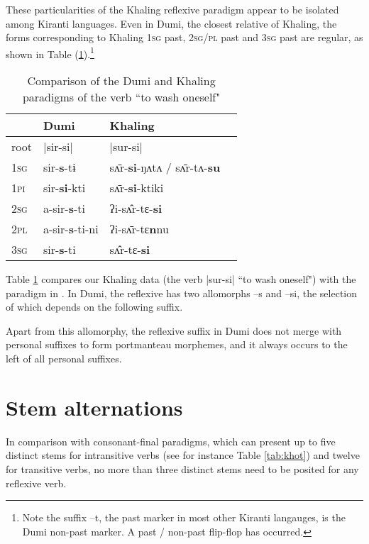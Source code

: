 \documentclass[twoside,a4paper,11pt]{article}
\newcommand{\ipa}[1]{{\phon#1}}
\begin{document}
These particularities of the Khaling reflexive paradigm appear to be isolated among Kiranti languages. Even in Dumi, the closest relative of Khaling, the forms corresponding to Khaling \textsc{1sg} past, \textsc{2sg/pl} past and \textsc{3sg} past are regular, as shown in Table (\ref{tab:dumi-khyal}).\footnote{Note the suffix --\ipa{t}, the past marker in most other Kiranti langauges, is the Dumi non-past marker. A past / non-past flip-flop has occurred. } 

\begin{table}[H] \centering
\caption{Comparison of the Dumi and Khaling paradigms of the verb ``to wash oneself"} \label{tab:dumi-khyal}
\begin{tabular}{llll}
\toprule
&	Dumi &	Khaling	\\
\midrule
root & |sir-si| & |sur-si|\\
\midrule
\textsc{1sg} &	\ipa{sir-\textbf{s}-tɨ} &	\ipa{sʌ̄r-\textbf{si}-ŋʌtʌ / sʌ̄r-tʌ-\textbf{su}} &	\\
\textsc{1pi} &	\ipa{sir-\textbf{si}-kti} &	\ipa{sʌ̄r-\textbf{si}-ktiki} &	\\
\textsc{2sg} &	\ipa{a-sir-\textbf{s}-ti} &	\ipa{ʔi-sʌ̂r-tɛ-\textbf{si}} &	\\
\textsc{2pl} &	\ipa{a-sir-\textbf{s}-ti-ni} &	\ipa{ʔi-sʌ̄r-tɛ\textbf{n}nu} &	\\
\textsc{3sg} &	\ipa{sir-\textbf{s}-ti} &	\ipa{sʌ̂r-tɛ-\textbf{si}} &	\\
\bottomrule
\end{tabular}
\end{table}


Table \ref{tab:dumi-khyal} compares our Khaling data (the verb |sur-si| ``to wash oneself") with the paradigm in \citet[125;362-3]{driem93dumi}. In Dumi, the reflexive has two allomorphs \ipa{--s} and \ipa{--si}, the selection of which depends on the following suffix. 

Apart from this allomorphy, the reflexive suffix in Dumi does not merge with personal suffixes to form portmanteau morphemes, and it always occurs to the left of all personal suffixes. 

 
 



\section{Stem alternations}
In comparison with consonant-final paradigms, which can present up to five distinct stems for intransitive verbs (see for instance Table \ref{tab:khot}) and twelve for transitive verbs, no more than three distinct stems need to be posited for any reflexive verb.
\end{document}
